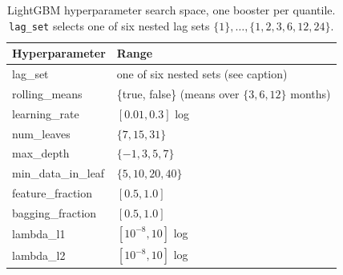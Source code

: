 \begin{table}[htbp]
  \centering\small
  \caption{LightGBM hyperparameter search space, one booster per quantile. \texttt{lag\_set} selects one of six nested lag sets $\{1\},\dots,\{1,2,3,6,12,24\}$.}
  \label{tab:app_lgbm_space}
  \begin{tabular}{@{}ll@{}}
    \toprule
    \textbf{Hyperparameter} & \textbf{Range} \\
    \midrule
    lag\_set          & one of six nested sets (see caption) \\
    rolling\_means    & \{true, false\} (means over $\{3,6,12\}$ months) \\
    learning\_rate    & $[0.01, 0.3]$ log \\
    num\_leaves       & $\{7, 15, 31\}$ \\
    max\_depth        & $\{-1, 3, 5, 7\}$ \\
    min\_data\_in\_leaf & $\{5, 10, 20, 40\}$ \\
    feature\_fraction & $[0.5, 1.0]$ \\
    bagging\_fraction & $[0.5, 1.0]$ \\
    lambda\_l1        & $[10^{-8}, 10]$ log \\
    lambda\_l2        & $[10^{-8}, 10]$ log \\
    \bottomrule
  \end{tabular}
\end{table}


